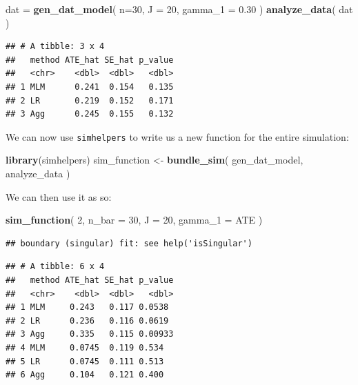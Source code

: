 \documentclass[
]{book}
\newenvironment{Shaded}{\begin{snugshade}}{\end{snugshade}}
\newcommand{\AttributeTok}[1]{\textcolor[rgb]{0.13,0.29,0.53}{#1}}
\newcommand{\DecValTok}[1]{\textcolor[rgb]{0.00,0.00,0.81}{#1}}
\newcommand{\FloatTok}[1]{\textcolor[rgb]{0.00,0.00,0.81}{#1}}
\newcommand{\FunctionTok}[1]{\textcolor[rgb]{0.13,0.29,0.53}{\textbf{#1}}}
\newcommand{\NormalTok}[1]{#1}
\newcommand{\OtherTok}[1]{\textcolor[rgb]{0.56,0.35,0.01}{#1}}
\begin{document}
\begin{Shaded}
\begin{Highlighting}[]
\NormalTok{dat }\OtherTok{=} \FunctionTok{gen\_dat\_model}\NormalTok{( }\AttributeTok{n=}\DecValTok{30}\NormalTok{, }\AttributeTok{J =} \DecValTok{20}\NormalTok{, }\AttributeTok{gamma\_1 =} \FloatTok{0.30}\NormalTok{ )}
\FunctionTok{analyze\_data}\NormalTok{( dat )}
\end{Highlighting}
\end{Shaded}

\begin{verbatim}
## # A tibble: 3 x 4
##   method ATE_hat SE_hat p_value
##   <chr>    <dbl>  <dbl>   <dbl>
## 1 MLM      0.241  0.154   0.135
## 2 LR       0.219  0.152   0.171
## 3 Agg      0.245  0.155   0.132
\end{verbatim}

We can now use \texttt{simhelpers} to write us a new function for the entire simulation:

\begin{Shaded}
\begin{Highlighting}[]
\FunctionTok{library}\NormalTok{(simhelpers)}
\NormalTok{sim\_function }\OtherTok{\textless{}{-}} \FunctionTok{bundle\_sim}\NormalTok{( gen\_dat\_model, analyze\_data )}
\end{Highlighting}
\end{Shaded}

We can then use it as so:

\begin{Shaded}
\begin{Highlighting}[]
\FunctionTok{sim\_function}\NormalTok{( }\DecValTok{2}\NormalTok{, }\AttributeTok{n\_bar =} \DecValTok{30}\NormalTok{, }\AttributeTok{J =} \DecValTok{20}\NormalTok{, }\AttributeTok{gamma\_1 =}\NormalTok{ ATE )}
\end{Highlighting}
\end{Shaded}

\begin{verbatim}
## boundary (singular) fit: see help('isSingular')
\end{verbatim}

\begin{verbatim}
## # A tibble: 6 x 4
##   method ATE_hat SE_hat p_value
##   <chr>    <dbl>  <dbl>   <dbl>
## 1 MLM     0.243   0.117 0.0538 
## 2 LR      0.236   0.116 0.0619 
## 3 Agg     0.335   0.115 0.00933
## 4 MLM     0.0745  0.119 0.534  
## 5 LR      0.0745  0.111 0.513  
## 6 Agg     0.104   0.121 0.400
\end{verbatim}
\end{document}
